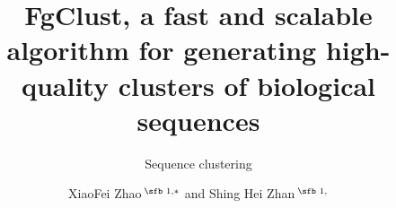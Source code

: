 \documentclass{bioinfo}
\begin{document}

\subtitle{Sequence clustering}

\title[FgClust]{FgClust, a fast and scalable algorithm for generating high-quality clusters of biological sequences}
\author[XiaoFei Zhao \textit{et~al}.]{
	XiaoFei Zhao\,$^{\text{\sfb 1,}*}$
	and Shing Hei Zhan\,$^{\text{\sfb 1,}}$}
\address{$^{\text{\sf 1}}$Bioinformatics Department, Fusion Genomics Corporation, Burnaby, V5A 4W9, Canada 
}



\end{document}
